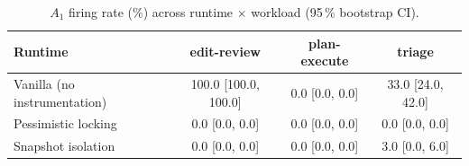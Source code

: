 \begin{table}[t]
\centering
\caption{$A_1$ firing rate (\%) across runtime $\times$ workload (95\,\% bootstrap CI).}
\label{tab:real-llm-baseline}
\small
\begin{tabular}{lccc}
\toprule
Runtime & edit-review & plan-execute & triage \\
\midrule
Vanilla (no instrumentation) & 100.0 [100.0, 100.0] & 0.0 [0.0, 0.0] & 33.0 [24.0, 42.0] \\
Pessimistic locking & 0.0 [0.0, 0.0] & 0.0 [0.0, 0.0] & 0.0 [0.0, 0.0] \\
Snapshot isolation & 0.0 [0.0, 0.0] & 0.0 [0.0, 0.0] & 3.0 [0.0, 6.0] \\
\bottomrule
\end{tabular}
\end{table}